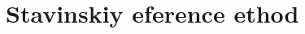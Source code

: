\documentclass[ALICE,manyauthors]{cernphprep}
\begin{document}


\newpage
\appendix
%
\renewcommand{\thesubfigure}{\thefigure(\alph{subfigure})}
\makeatletter
\renewcommand{\p@subfigure}{}
\renewcommand{\@thesubfigure}{(\alph{subfigure})\hskip\subfiglabelskip}
%

\section{Stavinskiy {\color{red}{R}}{\color{blue}{r}}eference {\color{red}{M}}{\color{blue}{m}}ethod}
\label{App:StavMethod}
\end{document}
